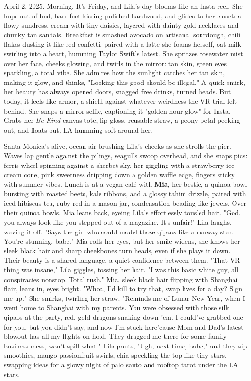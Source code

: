 \documentclass{article}
\begin{document}
April 2, 2025. Morning. It's Friday, and Lila's day blooms like an Insta reel. She hops out of bed, bare feet kissing polished hardwood, and glides to her closet: a flowy sundress, cream with tiny daisies, layered with dainty gold necklaces and chunky tan sandals. Breakfast is smashed avocado on artisanal sourdough, chili flakes dusting it like red confetti, paired with a latte she foams herself, oat milk swirling into a heart, humming Taylor Swift's latest. She spritzes rosewater mist over her face, cheeks glowing, and twirls in the mirror: tan skin, green eyes sparkling, a total vibe. She admires how the sunlight catches her tan skin, making it glow, and thinks, "Looking this good should be illegal." A quick smirk, her beauty has always opened doors, snagged free drinks, turned heads. But today, it feels like armor, a shield against whatever weirdness the VR trial left behind. She snaps a mirror selfie, captioning it "golden hour glow" for Insta. Grabs her \textit{Be Kind} canvas tote, lip gloss, reusable straw, a peony petal peeking out, and floats out, LA humming soft around her.

Santa Monica's alive, ocean air brushing Lila's cheeks as she strolls the pier. Waves lap gentle against the pilings, seagulls swoop overhead, and she snaps pics: ferris wheel spinning against a sherbet sky, her giggling with a strawberry ice cream cone, pink sweetness dripping down a golden waffle edge, fingers sticky with summer vibes. Lunch is at a vegan café with \textbf{Mia}, her bestie, a quinoa bowl bursting with roasted beets, kale ribbons, and a glossy tahini drizzle, paired with iced hibiscus tea, ruby-red in a mason jar, condensation beading like jewels. Over their quinoa bowls, Mia leans back, eyeing Lila's effortlessly tousled hair. "God, you always look like you stepped out of a magazine. It's unfair!" Lila laughs, waving it off. "Says the girl who could model those qipaos like a runway star. You're stunning, babe." Mia rolls her eyes, but her smile widens, she knows her sleek black hair and sharp cheekbones turn heads, even if she plays it down. Their beauty is a shared language, a quiet confidence between them. "That VR thing was insane," Lila giggles, tossing her hair. "I was this basic white guy, all conspiracies nonstop. Total rush." Mia, sleek black hair flipping with Shanghai flair, leans in, eyes bright. "Whoa, I'd kill to try that, swap lives for a day? Sign me up." She smirks, twirling her straw. "Reminds me of Lunar New Year, when I went home to Shanghai with my parents. You were obsessed with those silk qipaos at the party, red, gold dragons snaking down 'em. I could've grabbed one for you, but you didn't say, and now I'm stuck here'cause Mom and Dad's latest blowout has all my flights on hold. They dragged me there for some family business mess, won't spill what." Lila pouts, "Ugh, next time, babe," and they sip smoothies, mango-passionfruit swirls, chia speckling the top like tiny stars, swapping ideas for a glowy night of palo santo and rooftop tarot under the LA stars.
\end{document}
